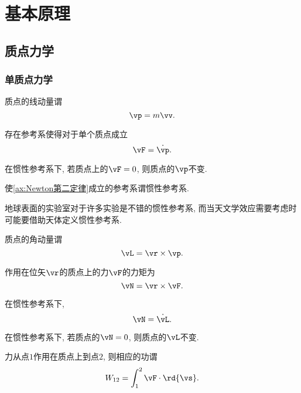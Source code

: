 \documentclass[../TheoreticalMechanics.tex]{subfiles}
\begin{document}
\section{基本原理} %
\label{sec:基本原理}

\subsection{质点力学} %
\label{sub:质点力学}

\subsubsection{单质点力学} %
\label{ssub:单质点力学}

\begin{definition}[线动量]
	质点的线动量谓
	\[ \vp = m\vv. \]
\end{definition}
\begin{finale}
	\begin{axiom}[Newton第二定律]	
		\label{ax:Newton第二定律}
		存在参考系使得对于单个质点成立
		\[ \vF = \dot{\vp}. \]
	\end{axiom}
\end{finale}
\begin{corollary}[动量守恒]
	在惯性参考系下, 若质点上的$\vF=0$, 则质点的$\vp$不变.
\end{corollary}
\begin{definition}[惯性参考系]
	使\cref{ax:Newton第二定律}成立的参考系谓惯性参考系.
\end{definition}
\begin{ex}
	地球表面的实验室对于许多实验是不错的惯性参考系, 而当天文学效应需要考虑时可能要借助天体定义惯性参考系.
\end{ex}
\begin{definition}[角动量]
	质点的角动量谓
	\[ \vL = \vr \times \vp. \]
\end{definition}
\begin{definition}[力矩]
	作用在位矢$\vr$的质点上的力$\vF$的力矩为
	\[ \vN = \vr \times \vF. \]
\end{definition}
\begin{corollary}[角动量定理]
	在惯性参考系下,
	\[ \vN = \dot{\vL}. \]
\end{corollary}
\begin{corollary}[角动量守恒]
	在惯性参考系下, 若质点的$\vN=0$, 则质点的$\vL$不变.
\end{corollary}
\begin{definition}[功]
	力从点$1$作用在质点上到点$2$, 则相应的功谓
	\[ W_{12} = \int_1^2 \vF\cdot\rd{\vs}. \]
\end{definition}
\end{document}
